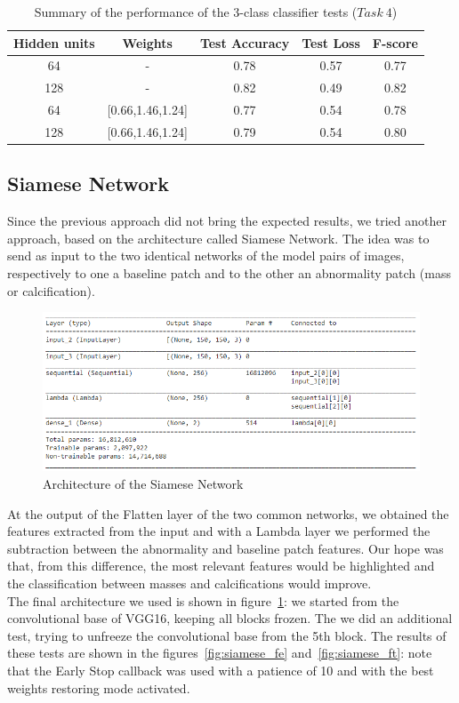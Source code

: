 \documentclass[11pt,a4paper,oneside]{article}
\begin{document}
\begin{table}[h]
\centering
	\begin{tabular}{|cc|ccc|}
	\hline
	Hidden units & Weights & Test Accuracy & Test Loss & F-score \\
	\hline
	64  &	-    		   & 0.78 & 0.57 & 0.77 \\
	128 &	-  			   & 0.82 & 0.49 & 0.82 \\
	64  & [0.66,1.46,1.24] & 0.77 & 0.54 & 0.78 \\
	128 & [0.66,1.46,1.24] & 0.79 & 0.54 & 0.80 \\
	\hline
	\end{tabular}
\caption{Summary of the performance of the 3-class classifier tests ($Task\ 4$)}
\end{table}

\clearpage

\subsection{Siamese Network}
Since the previous approach did not bring the expected results, we tried another approach, based on the architecture called Siamese Network. The idea was to send as input to the two identical networks of the model pairs of images, respectively to one a baseline patch and to the other an abnormality patch (mass or calcification).

\begin{figure}[h]
\centering
\includegraphics[width=.5\textwidth]{images/4.1/Siamese/Model}
\caption{Architecture of the Siamese Network}
\label{fig:siamese_model}
\end{figure}

At the output of the Flatten layer of the two common networks, we obtained the features extracted from the input and with a Lambda layer we performed the subtraction between the abnormality and baseline patch features. Our hope was that, from this difference, the most relevant features would be highlighted and the classification between masses and calcifications would improve. \\
The final architecture we used is shown in figure~\ref{fig:siamese_model}: we started from the convolutional base of VGG16, keeping all blocks frozen. The we did an additional test, trying to unfreeze the convolutional base from the 5th block. The results of these tests are shown in the figures~\ref{fig:siamese_fe} and~\ref{fig:siamese_ft}: note that the Early Stop callback was used with a patience of 10 and with the best weights restoring mode activated.
\end{document}
